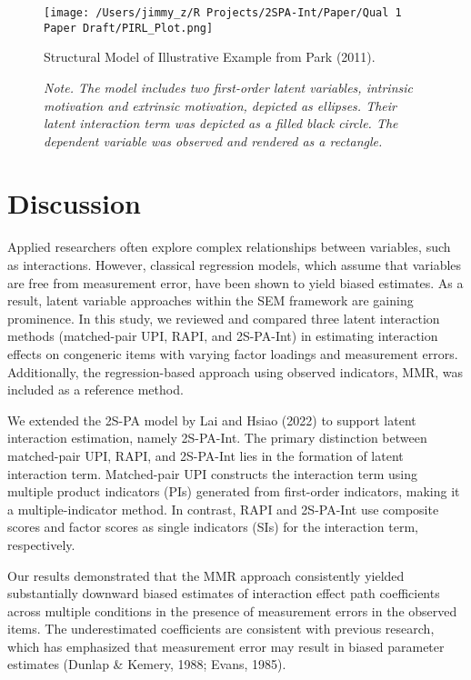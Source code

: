 \documentclass[
  man,mask]{apa6}
\begin{document}
\begin{figure}[h]
\centering
\texttt{[image: /Users/jimmy\_z/R Projects/2SPA-Int/Paper/Qual 1 Paper Draft/PIRL\_Plot.png]}
\caption{Structural Model of Illustrative Example from Park (2011).}
\caption*{\textit{Note. The model includes two first-order latent variables, intrinsic motivation and extrinsic motivation, depicted as ellipses. Their latent interaction term was depicted as a filled black circle. The dependent variable was observed and rendered as a rectangle.}}
\end{figure}

\section{Discussion}\label{discussion}

Applied researchers often explore complex relationships between variables, such as interactions. However, classical regression models, which assume that variables are free from measurement error, have been shown to yield biased estimates. As a result, latent variable approaches within the SEM framework are gaining prominence. In this study, we reviewed and compared three latent interaction methods (matched-pair UPI, RAPI, and 2S-PA-Int) in estimating interaction effects on congeneric items with varying factor loadings and measurement errors. Additionally, the regression-based approach using observed indicators, MMR, was included as a reference method.

We extended the 2S-PA model by Lai and Hsiao (2022) to support latent interaction estimation, namely 2S-PA-Int. The primary distinction between matched-pair UPI, RAPI, and 2S-PA-Int lies in the formation of latent interaction term. Matched-pair UPI constructs the interaction term using multiple product indicators (PIs) generated from first-order indicators, making it a multiple-indicator method. In contrast, RAPI and 2S-PA-Int use composite scores and factor scores as single indicators (SIs) for the interaction term, respectively.

Our results demonstrated that the MMR approach consistently yielded substantially downward biased estimates of interaction effect path coefficients across multiple conditions in the presence of measurement errors in the observed items. The underestimated coefficients are consistent with previous research, which has emphasized that measurement error may result in biased parameter estimates (Dunlap \& Kemery, 1988; Evans, 1985).
\end{document}
